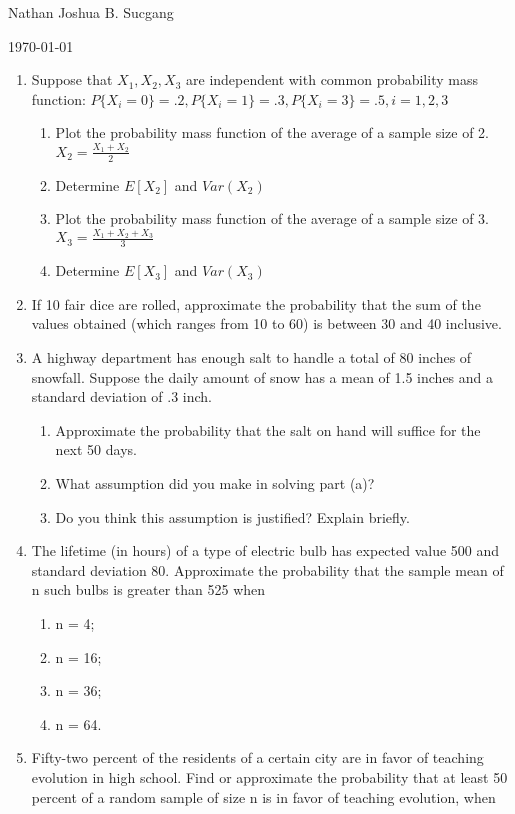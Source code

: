 \documentclass{article}
\begin{document}
Nathan Joshua B. Sucgang

\today

\begin{enumerate}
    \item Suppose that $X_1, X_2, X_3$ are independent with common probability mass function: $P\{X_i = 0 \} = .2, P\{X_i = 1 \} = .3, P\{X_i = 3 \} = .5, i = 1,2,3$
    \begin{enumerate}
        \item Plot the probability mass function of the average of a sample size of 2. $X_2 = \frac{X_1+X_2}{2}$
        \item Determine $E[X_2]$ and $Var(X_2)$
        \item Plot the probability mass function of the average of a sample size of 3. $X_3 = \frac{X_1+X_2+X_3}{3}$
        \item Determine $E[X_3]$ and $Var(X_3)$
    \end{enumerate}  
    \item If 10 fair dice are rolled, approximate the probability that the sum of the values obtained (which ranges from 10 to 60) is between 30 and 40 inclusive.
    \item A highway department has enough salt to handle a total of 80 inches of snowfall. Suppose the daily amount of snow has a mean of 1.5 inches and a standard deviation of .3 inch.
    \begin{enumerate}
        \item Approximate the probability that the salt on hand will suffice for the next 50 days.
        \item What assumption did you make in solving part (a)?
        \item Do you think this assumption is justified? Explain briefly.
    \end{enumerate}
    \item  The lifetime (in hours) of a type of electric bulb has expected value 500 and standard deviation 80. 
    Approximate the probability that the sample mean of n such bulbs is greater than 525 when
    \begin{enumerate}
        \item n = 4;
        \item n = 16;
        \item n = 36;
        \item n = 64.
    \end{enumerate}
    \item Fifty-two percent of the residents of a certain city are in favor of teaching evolution in high school. Find or approximate the probability that at least 50 percent of a random sample of size n is in favor of teaching evolution, when

\end{enumerate}
\end{document}
